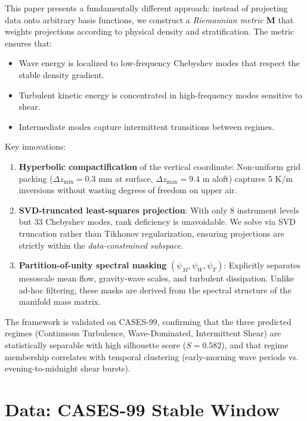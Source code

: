 \documentclass[11pt,a4paper]{article}
\begin{document}
This paper presents a fundamentally different approach: instead of projecting data onto arbitrary basis functions, we construct a \emph{Riemannian metric} $\mathbf{M}$ that weights projections according to physical density and stratification. The metric ensures that:
\begin{itemize}
  \item Wave energy is localized to low-frequency Chebyshev modes that respect the stable density gradient.
  \item Turbulent kinetic energy is concentrated in high-frequency modes sensitive to shear.
  \item Intermediate modes capture intermittent transitions between regimes.
\end{itemize}

Key innovations:
\begin{enumerate}
  \item \textbf{Hyperbolic compactification} of the vertical coordinate: Non-uniform grid packing ($\Delta z_{\min} = 0.3$ mm at surface, $\Delta z_{\max} = 9.4$ m aloft) captures 5 K/m inversions without wasting degrees of freedom on upper air.
  \item \textbf{SVD-truncated least-squares projection}: With only 8 instrument levels but 33 Chebyshev modes, rank deficiency is unavoidable. We solve via SVD truncation rather than Tikhonov regularization, ensuring projections are strictly within the \emph{data-constrained subspace}.
  \item \textbf{Partition-of-unity spectral masking} $(\psi_M, \psi_W, \psi_T)$: Explicitly separates mesoscale mean flow, gravity-wave scales, and turbulent dissipation. Unlike ad-hoc filtering, these masks are derived from the spectral structure of the manifold mass matrix.
\end{enumerate}

The framework is validated on CASES-99, confirming that the three predicted regimes (Continuous Turbulence, Wave-Dominated, Intermittent Shear) are statistically separable with high silhouette score ($S = 0.582$), and that regime membership correlates with temporal clustering (early-morning wave periods vs. evening-to-midnight shear bursts).

\section{Data: CASES-99 Stable Window}
\label{sec:data}
\end{document}
